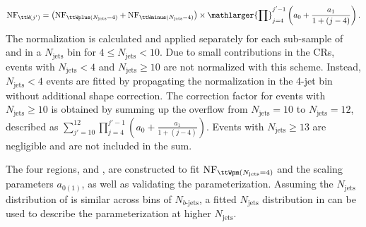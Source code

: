 \documentclass[../thesis.tex]{subfiles}
\begin{document}
\begin{equation}
\label{eq:ttWdd}
\mathrm{NF}_{\ttW(j')} = \left(\mathrm{NF}_{\ttWplus(N_\mathrm{jets}=4)} + \mathrm{NF}_{\ttWminus(N_\mathrm{jets}=4)}\right) \times \mathlarger{\prod}_{j=4}^{j'-1} \left( a_0 + \frac{a_1}{1+(j-4)} \right).
\end{equation}
The normalization is calculated and applied separately for each sub-sample of \ttWplus and \ttWminus in a $N_\mathrm{jets}$ bin for $4\leq N_\mathrm{jets}<10$. Due to small contributions in the \acs{CR}s, events with $N_\mathrm{jets}<4$ and $N_\mathrm{jets}\geq 10$ are not normalized with this scheme. Instead, $N_\mathrm{jets}<4$ events are fitted by propagating the normalization in the 4-jet bin without additional shape correction. The correction factor for \ttW events with $N_\mathrm{jets}\geq 10$ is obtained by summing up the overflow from $N_\mathrm{jets}=10$ to $N_\mathrm{jets}=12$, described as $\sum_{j'=10}^{12} \prod_{j=4}^{j'-1}\left(a_0+\frac{a_1}{1+(j-4)}\right)$. Events with $N_\mathrm{jets}\geq 13$ are negligible and are not included in the sum.

The four regions, \CRttWpm and \CRonebpm, are constructed to fit $\mathrm{NF}_{\ttWpm(N_\mathrm{jets}=4)}$ and the scaling parameters $a_{0(1)}$, as well as validating the parameterization. Assuming the $N_\mathrm{jets}$ distribution of \ttW is similar across bins of $N_{b\text{-jets}}$, a fitted $N_\mathrm{jets}$ distribution in \CRonebpm can be used to describe the \ttW parameterization at higher $N_\mathrm{jets}$.
\end{document}
